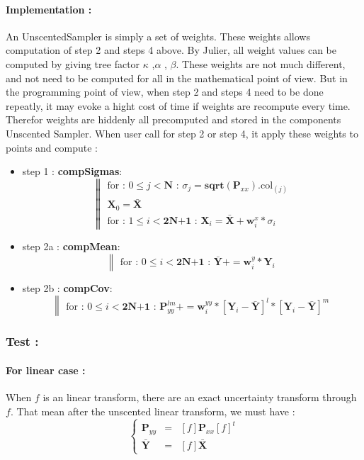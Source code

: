\documentclass[a4paper,10pt]{article}
\begin{document}
\paragraph{Implementation : } An UnscentedSampler is simply a set of weights. These weights allows computation of step 2 and steps 4 above. By Julier, all weight values can be computed by giving tree factor $\kappa$ ,$\alpha$ , $\beta$. These weights are not much different, and not need to be computed for all in the mathematical point of view. But in the programming point of view, when step 2 and steps 4 need to be done repeatly, it may evoke a hight cost of time if weights are recompute every time. Therefor weights are hiddenly all precomputed and stored in the components Unscented Sampler. When user call for step 2 or step 4, it apply these weights to points and compute :
\begin{itemize}
 \item  step 1 : \textbf{compSigmas}:
      \[
      \left\| 
      \begin{array}{l}
	    \text{for : } 0\leq j < \textbf{N} \textbf{ : } \sigma_j = \textbf{sqrt}(\textbf{P}_{xx}).\text{col}_{(j)}\\
	    \textbf{X}_0 = \bar{\textbf{X}} \\
	    \text{for : } 1\leq i < \textbf{2N+1} \textbf{ : } \textbf{X}_i = \bar{\textbf{X}}+ \textbf{w}^{x}_{i}*\sigma_i
      \end{array}\right.
      \]
 \item  step 2a : \textbf{compMean}:
      \[
      \left\| 
      \begin{array}{l}
	    \text{for : } 0\leq i < \textbf{2N+1} \textbf{ : } \bar{\textbf{Y}} += \textbf{w}^{y}_{i}*\textbf{Y}_i
      \end{array}\right.
      \]
 \item  step 2b : \textbf{compCov}:
      \[
      \left\| 
      \begin{array}{l}
	    \text{for : } 0\leq i < \textbf{2N+1} \textbf{ : } \textbf{P}^{lm}_{yy} += \textbf{w}^{yy}_{i}*\left[\textbf{Y}_i - \bar{\textbf{Y}} \right]^{l}  * \left[\textbf{Y}_i - \bar{\textbf{Y}} \right]^{m}
      \end{array}\right.
      \]
\end{itemize}
\subsubsection{Test : }
\paragraph{For linear case : }
When $f$ is an linear transform, there are an exact uncertainty transform through $f$. That mean after the unscented linear transform, we must have :
\[
\left\{ 
\begin{array}{ccl}
     \textbf{P}_{yy}  &=& \left[f\right]\textbf{P}_{xx}\left[f\right]^t  \\
     \bar{\textbf{Y}} &=& \left[f\right]\bar{\textbf{X}} 
\end{array}\right.
\]
\end{document}
